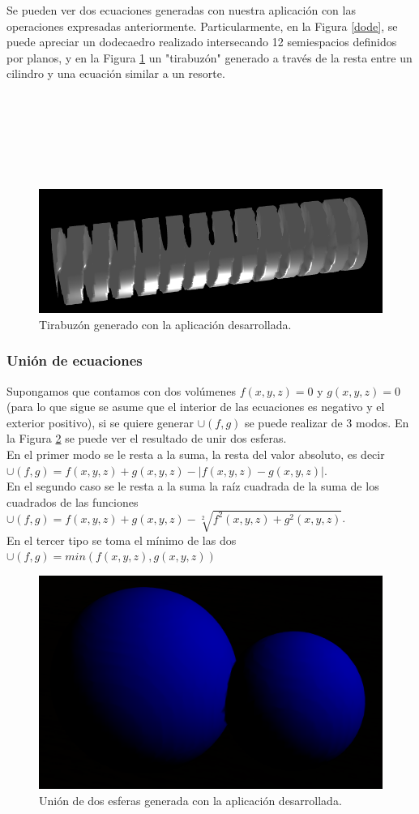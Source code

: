\documentclass[12pt]{article}
\begin{document}
Se pueden ver dos ecuaciones generadas con nuestra aplicación con las operaciones expresadas anteriormente. Particularmente, en la Figura \ref{dode}, se puede apreciar un dodecaedro realizado intersecando 12 semiespacios definidos por planos, y en la Figura \ref{tornillo} un "tirabuzón" generado a través de la resta entre un cilindro  y una ecuación similar a un resorte.
\\
\\
\\
\\
\\
\\
\\

\begin{figure}[h]
\includegraphics[width=0.7\linewidth,center]{tornillo.png}
\caption{Tirabuzón generado con la aplicación desarrollada.}
\label{tornillo}
\end{figure}
\subsubsection{Unión de ecuaciones}
Supongamos que contamos con dos volúmenes $f(x,y,z)=0$ y $g(x,y,z)=0$ (para lo que sigue se asume que el interior de las ecuaciones es negativo y el exterior positivo), si se quiere generar  $\cup(f,g)$ se puede realizar de 3 modos. En la Figura \ref{union} se puede ver el resultado de unir dos esferas.
\\En el primer modo se le resta a la suma, la resta del valor absoluto, es decir $\cup(f,g) =  f(x,y,z) + g(x,y,z) - |f(x,y,z) - g(x,y,z)|$. 
\\En el segundo caso se le resta a la suma la raíz cuadrada de la suma de los cuadrados de las funciones  $\cup(f,g) = f(x,y,z) + g(x,y,z) -\sqrt[2]{f^2(x,y,z) + g^2(x,y,z)}$.
\\En el tercer tipo se toma el mínimo de las dos  $\cup(f,g)=min(f(x,y,z),g(x,y,z))$
\clearpage
\begin{figure}[h]
\includegraphics[width=0.7\linewidth,center]{oi1.png}
\caption{Unión de dos esferas generada con la aplicación desarrollada.}
\label{union}
\end{figure}
\end{document}
